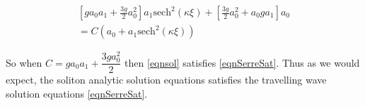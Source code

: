 \documentclass[subeqn]{article}
\begin{document}
\begin{multline*}
\left[ga_0a_1  +\frac{3g}{2} a_0^2 \right]  a_1\text{sech}^2\left( \kappa \xi\right)  + \left[\frac{3g}{2}a_0^2  + a_0 g a_1\right] a_0  \\=  C \left(a_0 + a_1\text{sech}^2\left( \kappa \xi\right) \right)
\end{multline*}

So when $C =ga_0a_1  +\dfrac{3ga_0^2}{2}   $ then \eqref{eqnsol} satisfies \eqref{eqnSerreSat}. Thus as we would expect, the soliton analytic solution equations satisfies the travelling wave solution equations \eqref{eqnSerreSat}. 
\end{document}
